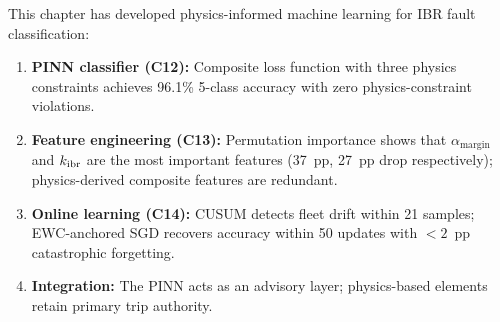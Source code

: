 This chapter has developed physics-informed machine learning for IBR
fault classification:
\begin{enumerate}
\item \textbf{PINN classifier (C12):} Composite loss function with three
      physics constraints achieves 96.1\% 5-class accuracy with zero
      physics-constraint violations.
\item \textbf{Feature engineering (C13):} Permutation importance shows
      that $\alpha_\mathrm{margin}$ and $k_\mathrm{ibr}$ are the most important
      features (37~pp, 27~pp drop respectively); physics-derived composite
      features are redundant.
\item \textbf{Online learning (C14):} CUSUM detects fleet drift within
      21 samples; EWC-anchored SGD recovers accuracy within 50 updates
      with $< 2$~pp catastrophic forgetting.
\item \textbf{Integration:} The PINN acts as an advisory layer; physics-based
      elements retain primary trip authority.
\end{enumerate}
